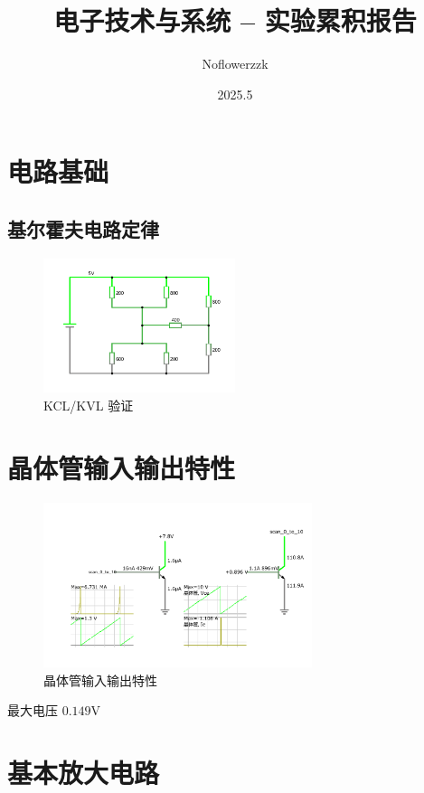 \documentclass{article}
\title{电子技术与系统 -- 实验累积报告}
\author{Noflowerzzk}
\date{2025.5}
\begin{document}
\maketitle

\section{电路基础}

\subsection{基尔霍夫电路定律}

\begin{figure}[htbp]
    \centering
    \includegraphics[width=0.5\textwidth]{KICL.pdf}
    \caption{KCL/KVL 验证}
\end{figure}

\section{晶体管输入输出特性}

\begin{figure}[htbp]
    \centering
    \includegraphics[width=0.7\textwidth]{晶体管输入输出.pdf}
    \caption{晶体管输入输出特性}
\end{figure}

最大电压 $0.149 \mathrm{V}$

\section{基本放大电路}
\end{document}
